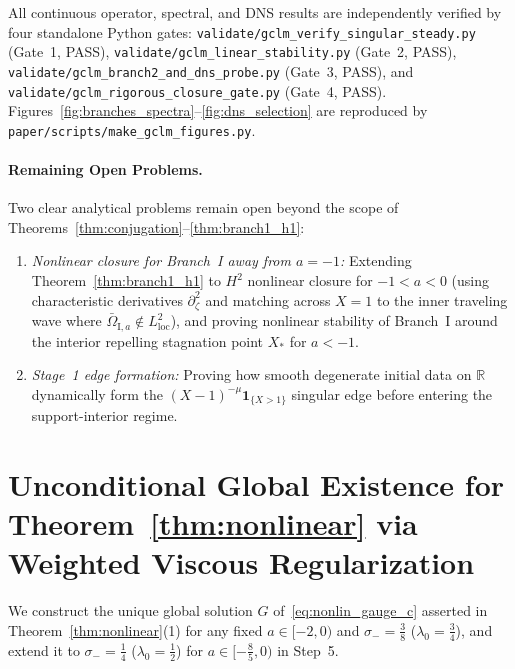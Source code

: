 \documentclass[11pt,a4paper]{article}
\begin{document}
All continuous operator, spectral, and DNS results are independently verified by four standalone Python gates:
\texttt{validate/\allowbreak gclm\_verify\_singular\_steady.py} (Gate~1, PASS),
\texttt{validate/\allowbreak gclm\_linear\_stability.py} (Gate~2, PASS),
\texttt{validate/\allowbreak gclm\_branch2\_and\_dns\_probe.py} (Gate~3, PASS), and
\texttt{validate/\allowbreak gclm\_rigorous\_closure\_gate.py} (Gate~4, PASS).
Figures~\ref{fig:branches_spectra}--\ref{fig:dns_selection} are reproduced by \texttt{paper/scripts/make\_gclm\_figures.py}.

\paragraph{Remaining Open Problems.}
Two clear analytical problems remain open beyond the scope of Theorems~\ref{thm:conjugation}--\ref{thm:branch1_h1}:
\begin{enumerate}
  \item \emph{Nonlinear closure for Branch~I away from $a = -1$:} Extending Theorem~\ref{thm:branch1_h1} to $H^2$ nonlinear closure for $-1 < a < 0$ (using characteristic derivatives $\partial_\zeta^2$ and matching across $X=1$ to the inner traveling wave where $\bar\Omega_{\mathrm{I},a} \notin L^2_{\mathrm{loc}}$), and proving nonlinear stability of Branch~I around the interior repelling stagnation point $X_*$ for $a < -1$.
  \item \emph{Stage~1 edge formation:} Proving how smooth degenerate initial data on $\mathbb{R}$ dynamically form the $(X-1)^{-\mu}\mathbf{1}_{\{X>1\}}$ singular edge before entering the support-interior regime.
\end{enumerate}

\appendix
\section{Unconditional Global Existence for Theorem~\ref{thm:nonlinear} via Weighted Viscous Regularization}\label{app:lwp}

We construct the unique global solution $G$ of~\eqref{eq:nonlin_gauge_c} asserted in Theorem~\ref{thm:nonlinear}(1) for any fixed $a \in [-2, 0)$ and $\sigma_- = \frac{3}{8}$ ($\lambda_0 = \frac{3}{4}$), and extend it to $\sigma_- = \frac{1}{4}$ ($\lambda_0 = \frac{1}{2}$) for $a \in [-\frac{8}{5}, 0)$ in Step~5.
\end{document}
